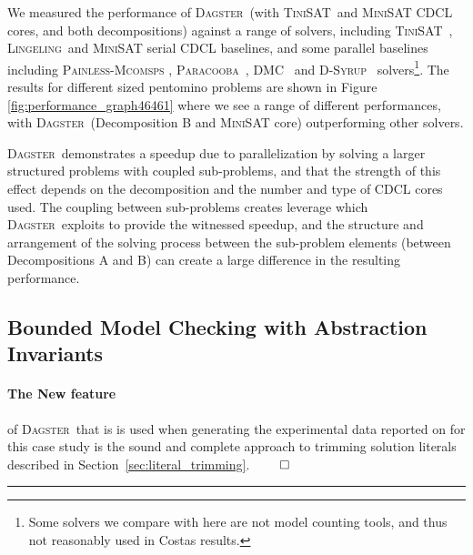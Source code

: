 \documentclass[10pt,a4paper,oneside,headinclude,footinclude,BCOR5mm]{scrartcl}
\newcommand{\dagster}{\textsc{Dagster}\xspace}
\newcommand{\tinisat}{\textsc{TiniSAT}\xspace}
\newcommand{\lingeling}{\textsc{Lingeling}\xspace}
\begin{document}
We measured the performance of \dagster\ (with \tinisat\ and \textsc{MiniSAT} CDCL cores, and both decompositions) against a range of solvers, including \tinisat\ , \lingeling\ and \textsc{MiniSAT} serial CDCL baselines, and some parallel baselines including \textsc{Painless-Mcomsps} \cite{LeFrioux:etal:2017}, \textsc{Paracooba}~\cite{heisinger:etal:2020}, \textsc{DMC}~\cite{lagniez:etal:2018} and \textsc{D-Syrup}~\cite{Audemard:etal:2017} solvers\footnote{Some solvers we compare with here are not model counting tools, and thus not reasonably used in Costas results.}. The results for different sized pentomino problems are shown in Figure \ref{fig:performance_graph46461} where we see a range of different performances, with \dagster\ (Decomposition B and \textsc{MiniSAT} core) outperforming other solvers.
	
\dagster\ demonstrates a speedup due to parallelization by solving a larger structured problems with coupled sub-problems, and that the strength of this effect depends on the decomposition and the number and type of CDCL cores used.
The coupling between sub-problems creates leverage which \dagster\ exploits to provide the witnessed speedup, and the structure and arrangement of the solving process between the sub-problem elements (between Decompositions A and B) can create a large difference in the resulting performance.




%
%


\FloatBarrier
\pagebreak
\subsection{Bounded Model Checking with Abstraction Invariants}\label{sec:mc:bmc}

\paragraph{The New feature} of \dagster\ that is is used when generating the experimental data reported on for this case study is the sound and complete approach to trimming solution literals described in Section~\ref{sec:literal_trimming}. $\qed$\\\rule{50pt}{5pt}
\end{document}
